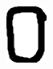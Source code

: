 \documentclass[russian,utf8,emptystyle]{eskdtext}
\begin{document}
\begin{figure}[!htb]
\includegraphics[width=\linewidth]{../data/learn/o/001}
\endminipage\hfill
{}

\end{figure}
\end{document}
